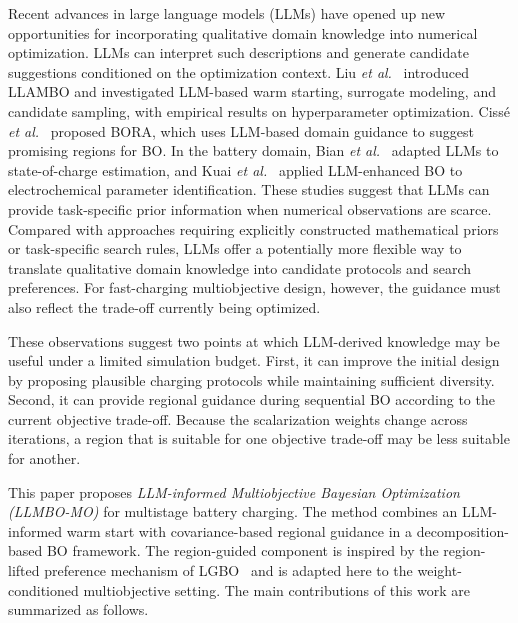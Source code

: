 \documentclass[journal]{IEEEtran}
\begin{document}
Recent advances in large language models (LLMs) have opened up new
opportunities for incorporating qualitative domain knowledge into numerical
optimization. LLMs can interpret such descriptions and generate candidate
suggestions conditioned on the optimization context. Liu \emph{et al.}~\cite{nref12}
introduced LLAMBO and investigated LLM-based warm starting, surrogate modeling,
and candidate sampling, with empirical results on hyperparameter optimization.
Ciss\'e \emph{et al.}~\cite{refBORA} proposed BORA, which uses LLM-based domain
guidance to suggest promising regions for BO. In the battery domain,
Bian \emph{et al.}~\cite{refBianLLM} adapted LLMs to state-of-charge estimation,
and Kuai \emph{et al.}~\cite{refKuaiLLMBO} applied LLM-enhanced BO to
electrochemical parameter identification. These studies suggest that LLMs
can provide task-specific prior information when numerical observations
are scarce. Compared with approaches requiring explicitly constructed
mathematical priors or task-specific search rules, LLMs offer a potentially
more flexible way to translate qualitative domain knowledge into candidate
protocols and search preferences. For fast-charging multiobjective design,
however, the guidance must also reflect the trade-off currently being
optimized.

These observations suggest two points at which LLM-derived knowledge may be
useful under a limited simulation budget. First, it can improve the initial
design by proposing plausible charging protocols while maintaining sufficient
diversity. Second, it can provide regional guidance during sequential BO
according to the current objective trade-off. Because the scalarization weights
change across iterations, a region that is suitable for one objective trade-off
may be less suitable for another.

This paper proposes \emph{LLM-informed Multiobjective Bayesian Optimization
(LLMBO-MO)} for multistage battery charging. The method combines an
LLM-informed warm start with covariance-based regional guidance in a
decomposition-based BO framework. The region-guided component is inspired by
the region-lifted preference mechanism of LGBO~\cite{ref5} and is adapted
here to the weight-conditioned multiobjective setting. The main contributions
of this work are summarized as follows.
\end{document}
